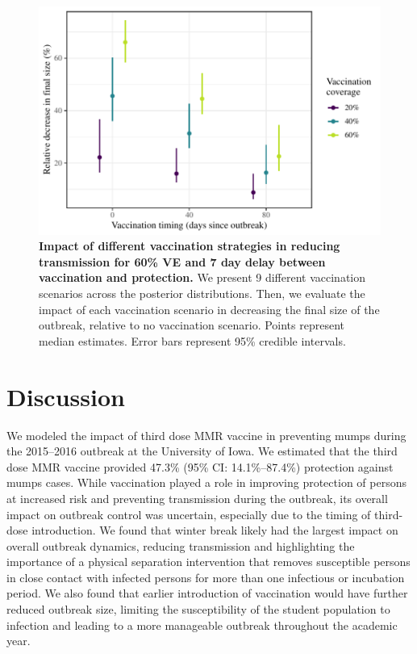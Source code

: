 \documentclass[12pt]{article}
\begin{document}
\begin{figure}[!h]
\includegraphics[width=\textwidth]{../figure_stanfit_seirv_final/figure_stanfit_strategy_summ.pdf}
\caption{
\textbf{Impact of different vaccination strategies in reducing transmission for 60\% VE and 7 day delay between vaccination and protection.}
We present 9 different vaccination scenarios across the posterior distributions.
Then, we evaluate the impact of each vaccination scenario in decreasing the final size of the outbreak, relative to no vaccination scenario.
Points represent median estimates.
Error bars represent 95\% credible intervals.
}
\label{fig:strat}
\end{figure}

\section{Discussion}

We modeled the impact of third dose MMR vaccine in preventing mumps during the 2015--2016 outbreak at the University of Iowa. 
We estimated that the third dose MMR vaccine provided 47.3\% (95\% CI: 14.1\%--87.4\%) protection against mumps cases. 
While vaccination played a role in improving protection of persons at increased risk and preventing transmission during the outbreak, its overall impact on outbreak control was uncertain, especially due to the timing of third-dose introduction. 
We found that winter break likely had the largest impact on overall outbreak dynamics, reducing transmission and highlighting the importance of a physical separation intervention that removes susceptible persons in close contact with infected persons for more than one infectious or incubation period. 
We also found that earlier introduction of vaccination would have further reduced outbreak size, limiting the susceptibility of the student population to infection and leading to a more manageable outbreak throughout the academic year. 
\end{document}
